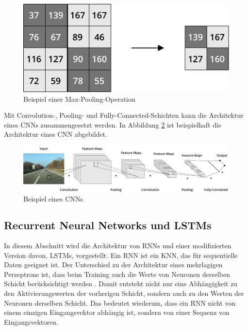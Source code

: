 \begin{figure}[h]
\centering
\includegraphics[scale=0.4]{images/pool_operation.pdf}
\caption{Beispiel einer Max-Pooling-Operation}
\label{fig_pool_operation}
\end{figure}

Mit Convolution-, Pooling- und Fully-Connected-Schichten kann die Architektur eines \acp{CNN} zusammengesetzt werden. In Abbildung \ref{fig_cnn} ist beispielhaft die Architektur eines \ac{CNN} abgebildet.


\begin{figure}[h]
\centering
\includegraphics[scale=0.2]{images/cnn.pdf}
\caption{Beispiel eines \aclp{CNN}}
\label{fig_cnn}
\end{figure}


\subsection{Recurrent Neural Networks und LSTMs}
\label{grundlagen_nn_rnn}

In diesem Abschnitt wird die Architektur von \acfp{RNN} und einer modifizierten Version davon, \acfp{LSTM}, vorgestellt. Ein \ac{RNN} ist ein \ac{KNN}, das für sequentielle Daten geeignet ist. Der Unterschied zu der Architektur eines mehrlagigen Perzeptrons ist, dass beim Training auch die Werte von Neuronen derselben Schicht berücksichtigt werden \cite{graves2012rnn}. Damit entsteht nicht nur eine Abhängigkeit zu den Aktivierungswerten der vorherigen Schicht, sondern auch zu den Werten der Neuronen derselben Schicht. Das bedeutet wiederum, dass ein \ac{RNN} nicht von einem einzigen Eingangsvektor abhängig ist, sondern von einer Sequenz von Eingangsvektoren. 

